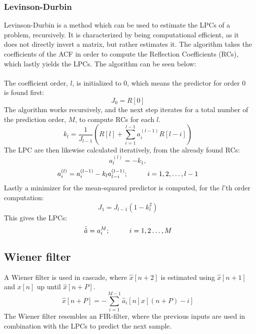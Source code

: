 \subsubsection{Levinson-Durbin}
Levinson-Durbin is a method which can be used to estimate the LPCs of a problem, recursively. It is characterized by being computational efficient, as it does not directly invert a matrix, but rather estimates it.
The algorithm takes the coefficients of the ACF in order to compute the Reflection Coefficients (RCs), which lastly yields the LPCs. The algorithm can be seen below:\\\\
The coefficient order, $l$, is initialized to 0, which means the predictor for order 0 is found first:
\begin{equation}\label{LDInit}
	J_0=R[0]
\end{equation}
The algorithm works recursively, and the next step iterates for a total number of the prediction order, $M$, to compute RCs for each $l$.
\begin{equation}\label{LDStep1}
	k_l=\frac{1}{J_{l-1}} \left ( R[l] + \sum_{i=1}^{l-1} a_i^{(l-1)}R[l-i]   \right) 
\end{equation}
The LPC are then likewise calculated iteratively, from the already found RCs: 
\begin{equation}\label{LDStep2_1}
	a_l^{(l)} = -k_1,
\end{equation}
\begin{equation}\label{LDStep2_2}
a_i^{(l)} = a_i^{(l-1)} - k_l a_{l-i}^{(l-1)} ; \hspace{10mm} i = 1,2,\dotsc,l-1
\end{equation}
Lastly a minimizer for the mean-squared predictor is computed, for the $l$'th order computation:
\begin{equation}\label{LDStep2}
	J_1 = J_{l-1} (1-k_l^2)
\end{equation}
This gives the LPCs:
\begin{equation}
	\bar{\hat{a}} = a_i^{M}; \hspace{10mm} i = 1,2 \dotsc , M
\end{equation}

\subsection{Wiener filter}
A Wiener filter is used in cascade, where $\hat{x}[n+2]$ is estimated using $\hat{x}[n+1]$ and $x[n]$ up until $\hat{x}[n+P]$. 
\begin{equation}\label{eq:AppPredictor}
\hat{x}[n+P] =- \sum^{M-1}_{i=1}\hat{a}_i[n]x[(n+P)-i]
\end{equation}
The Wiener filter resembles an FIR-filter, where the previous inputs are used in combination with the LPCs to predict the next sample. 

